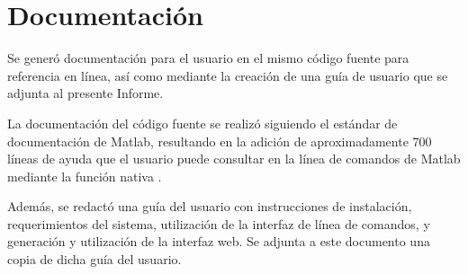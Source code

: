 %
%
\section{Documentación}
%
Se generó documentación para el usuario en el mismo código fuente para
referencia en línea, así como mediante la creación de una guía de
usuario que se adjunta al presente Informe.

La documentación del código fuente se realizó siguiendo el estándar de
documentación de Matlab, resultando en la adición de aproximadamente
700 líneas de ayuda que el usuario puede consultar en la línea de
comandos de Matlab mediante la función nativa .

Además, se redactó una guía del usuario con instrucciones de
instalación, requerimientos del sistema, utilización de la interfaz de
línea de comandos, y generación y utilización de la interfaz web.  Se
adjunta a este documento una copia de dicha guía del usuario.

